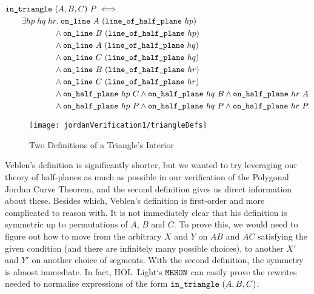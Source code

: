 \begin{equation}\label{eq:inTriangleDef}
\begin{split}
  &\code{in\_triangle}\ (A,B,C)\ P \iff\\
    &\qquad\exists hp\; hq\; hr.\;\code{on\_line}\ A\ (\code{line\_of\_half\_plane}\ hp)\\
    &\qquad\qquad\qquad\wedge \code{on\_line}\ B\ (\code{line\_of\_half\_plane}\  hp)\\
    &\qquad\qquad\qquad\wedge \code{on\_line}\ A\ (\code{line\_of\_half\_plane}\  hq)\\
    &\qquad\qquad\qquad\wedge \code{on\_line}\ C\ (\code{line\_of\_half\_plane}\  hq)\\
    &\qquad\qquad\qquad\wedge \code{on\_line}\ B\ (\code{line\_of\_half\_plane}\  hr)\\
    &\qquad\qquad\qquad\wedge \code{on\_line}\ C\ (\code{line\_of\_half\_plane}\  hr)\\
    &\qquad\qquad\qquad\wedge \code{on\_half\_plane}\ hp\ C \wedge \code{on\_half\_plane}\ hq\ B \wedge \code{on\_half\_plane}\ hr\ A\\
    &\qquad\qquad\qquad\wedge \code{on\_half\_plane}\ hp\ P \wedge \code{on\_half\_plane}\ hq\ P \wedge \code{on\_half\_plane}\ hr\ P.
\end{split}
\end{equation}

\begin{figure}
\centering\texttt{[image: jordanVerification1/triangleDefs]}
\caption{Two Definitions of a Triangle's Interior}
\label{fig:triangleDefs}
\end{figure}

Veblen's definition is significantly shorter, but we wanted to try leveraging our theory of half-planes as much as possible in our verification of the Polygonal Jordan Curve Theorem, and the second definition gives us direct information about these. Besides which, Veblen's definition is first-order and more complicated to reason with. It is not immediately clear that his definition is symmetric up to permutations of $A$, $B$ and $C$. To prove this, we would need to figure out how to move from the arbitrary $X$ and $Y$ on $AB$ and $AC$ satisfying the given condition (and there are infinitely many possible choices), to another $X'$ and $Y'$ on another choice of segments. With the second definition, the symmetry is almost immediate. In fact, HOL~Light`s $\texttt{MESON}$ can easily prove the rewrites needed to normalise expressions of the form $\texttt{in\_triangle}\ (A,B,C)$. 

